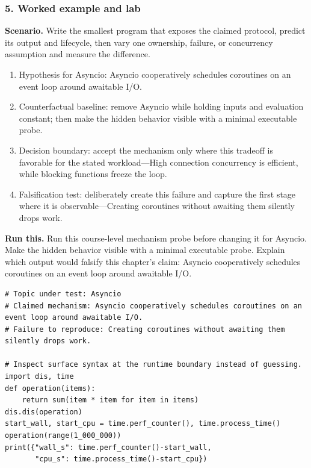 \subsubsection*{5. Worked example and lab}
\textbf{Scenario.} Write the smallest program that exposes the claimed protocol, predict its output and lifecycle, then vary one ownership, failure, or concurrency assumption and measure the difference.
\begin{enumerate}
\item Hypothesis for Asyncio: Asyncio cooperatively schedules coroutines on an event loop around awaitable I/O.
\item Counterfactual baseline: remove Asyncio while holding inputs and evaluation constant; then make the hidden behavior visible with a minimal executable probe.
\item Decision boundary: accept the mechanism only where this tradeoff is favorable for the stated workload—High connection concurrency is efficient, while blocking functions freeze the loop.
\item Falsification test: deliberately create this failure and capture the first stage where it is observable—Creating coroutines without awaiting them silently drops work.
\end{enumerate}
\textbf{Run this.} Run this course-level mechanism probe before changing it for Asyncio. Make the hidden behavior visible with a minimal executable probe. Explain which output would falsify this chapter's claim: Asyncio cooperatively schedules coroutines on an event loop around awaitable I/O.
\begin{Verbatim}[fontsize=\scriptsize]
# Topic under test: Asyncio
# Claimed mechanism: Asyncio cooperatively schedules coroutines on an event loop around awaitable I/O.
# Failure to reproduce: Creating coroutines without awaiting them silently drops work.

# Inspect surface syntax at the runtime boundary instead of guessing.
import dis, time
def operation(items):
    return sum(item * item for item in items)
dis.dis(operation)
start_wall, start_cpu = time.perf_counter(), time.process_time()
operation(range(1_000_000))
print({"wall_s": time.perf_counter()-start_wall,
       "cpu_s": time.process_time()-start_cpu})
\end{Verbatim}
